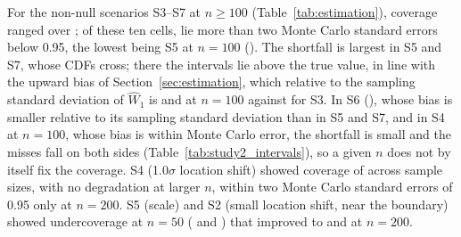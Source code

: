 \documentclass[AMA,Times1COL]{WileyNJDv5}
\begin{document}
For the non-null scenarios S3--S7 at $n \geq 100$ (Table~\ref{tab:estimation}), coverage ranged over ; of these ten cells,  lie more than two Monte Carlo standard errors below 0.95, the lowest being S5 at $n = 100$ (). The shortfall is largest in S5 and S7, whose CDFs cross; there the intervals lie above the true value, in line with the upward bias of Section~\ref{sec:estimation}, which relative to the sampling standard deviation of $\widehat{W}_1$ is  and  at $n = 100$ against  for S3. In S6 (), whose bias is smaller relative to its sampling standard deviation than in S5 and S7, and in S4 at $n = 100$, whose bias is within Monte Carlo error, the shortfall is small and the misses fall on both sides (Table~\ref{tab:study2_intervals}), so a given $n$ does not by itself fix the coverage.
S4 (1.0$\sigma$ location shift) showed coverage of  across sample sizes, with no degradation at larger $n$, within two Monte Carlo standard errors of 0.95 only at $n = 200$. S5 (scale) and S2 (small location shift, near the boundary) showed undercoverage at $n=50$ ( and ) that improved to  and  at $n=200$.
\end{document}
